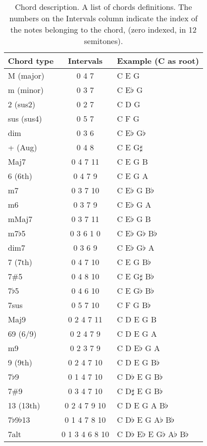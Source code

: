 \begin{table}[ht!]
\centering
  \caption[Chord description.] {Chord description. A list of chords definitions.  The numbers on the Intervals column indicate the index of the notes belonging to the chord, (zero indexed, in 12 semitones).}
  \label{tab:chord_extensions}
  \begin{tabular}{  l  c  l }
    \hline
    Chord type & Intervals & Example (C as root) \\ \hline
    M (major) & 0 4 7 & C E G \\
    m (minor) & 0 3 7 & C E$\flat$ G \\
    2 (sus2) & 0 2 7 & C D G \\
	sus (sus4) & 0 5 7 & C F G \\
    dim & 0 3 6 &  C E$\flat$ G$\flat$\\
    + (Aug) & 0 4 8 & C E G$\sharp$ \\
	Maj7 & 0 4 7 11 & C E G B \\
	6 (6th) & 0 4 7 9 & C E G A \\
	m7 & 0 3 7 10 & C E$\flat$ G B$\flat$ \\
	m6 & 0 3 7 9 & C E$\flat$ G A \\
	mMaj7 & 0 3 7 11 & C E$\flat$ G B \\
    m7$\flat$5 & 0 3 6 1 0& C E$\flat$ G$\flat$ B$\flat$ \\
    dim7 & 0 3 6 9 & C E$\flat$ G$\flat$ A \\
	7 (7th) & 0 4 7 10 & C E G B$\flat$ \\
	7\#5 & 0 4 8 10 & C E G$\sharp$ B$\flat$ \\
	7$\flat$5 & 0 4 6 10 & C E G$\flat$ B$\flat$ \\
	7sus & 0 5 7 10 & C F G B$\flat$ \\
	Maj9 & 0 2 4 7 11 & C D E G B \\
	69 (6/9) & 0 2 4 7 9 & C D E G A \\
	m9 & 0 2 3 7 9 & C D E$\flat$ G A \\
	9 (9th) & 0 2 4 7 10 & C D E G B$\flat$ \\
	7$\flat$9 & 0 1 4 7 10 & C D$\flat$ E G B$\flat$ \\
	7\#9 & 0 3 4 7 10 & C D$\sharp$ E G B$\flat$ \\
	13 (13th) & 0 2 4 7 9 10 & C D E G A B$\flat$ \\
	7$\flat$9$\flat$13 & 0 1 4 7 8 10 & C D$\flat$ E G A$\flat$ B$\flat$ \\
	7alt & 0 1 3 4 6 8 10 & C D$\flat$ E$\flat$ E G$\flat$ A$\flat$ B$\flat$ \\
    \hline
  \end{tabular}

\end{table}
